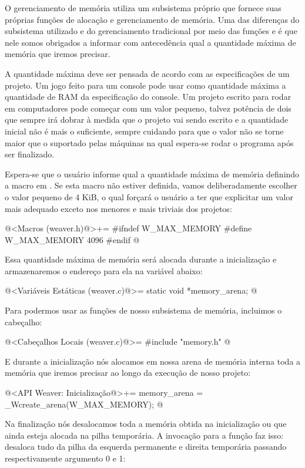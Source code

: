 
O gerenciamento de memória utiliza um subsistema próprio que fornece
suas próprias funções de alocação e gerenciamento de memória. Uma das
diferenças do subsistema utilizado e do gerenciamento tradicional por
meio das funções  e  é que nele
somos obrigados a informar com antecedência qual a quantidade máxima
de memória que iremos precisar.

A quantidade máxima deve ser pensada de acordo com as especificações
de um projeto. Um jogo feito para um console pode usar como quantidade
máxima a quantidade de RAM da especificação do console. Um projeto
escrito para rodar em computadores pode começar com um valor pequeno,
talvez potência de dois que sempre irá dobrar à medida que o projeto
vai sendo escrito e a quantidade inicial não é mais o suficiente,
sempre cuidando para que o valor não se torne maior que o suportado
pelas máquinas na qual espera-se rodar o programa após ser finalizado.

Espera-se que o usuário informe qual a quantidade máxima de memória
definindo a macro 
em . Se esta macro não estiver definida, vamos
deliberadamente escolher o valor pequeno de 4 KiB, o qual forçará o
usuário a ter que explicitar um valor mais adequado exceto nos
menores e mais triviais dos projetos:

\iniciocodigo
@<Macros (weaver.h)@>+=
#ifndef W_MAX_MEMORY
#define W_MAX_MEMORY 4096
#endif
@
\fimcodigo

Essa quantidade máxima de memória será alocada durante a inicialização
e armazenaremos o endereço para ela na variável abaixo:

\iniciocodigo
@<Variáveis Estáticas (weaver.c)@>=
static void *memory_arena;
@
\fimcodigo

Para podermos usar as funções de nosso subsistema de memória,
incluimos o cabeçalho:

\iniciocodigo
@<Cabeçalhos Locais (weaver.c)@>=
#include "memory.h"
@
\fimcodigo

E durante a inicialização nós alocamos em nossa arena de memória
interna toda a memória que iremos precisar ao longo da execução de
nosso projeto:

\iniciocodigo
@<API Weaver: Inicialização@>+=
memory_arena = _Wcreate_arena(W_MAX_MEMORY);
@
\fimcodigo

Na finalização nós desalocamos toda a memória obtida na inicialização
ou que ainda esteja alocada na pilha temporária. A invocação para a
função  faz isso: desaloca tudo da pilha da
esquerda permanente e direita temporária passando respectivamente
argumento 0 e 1:

